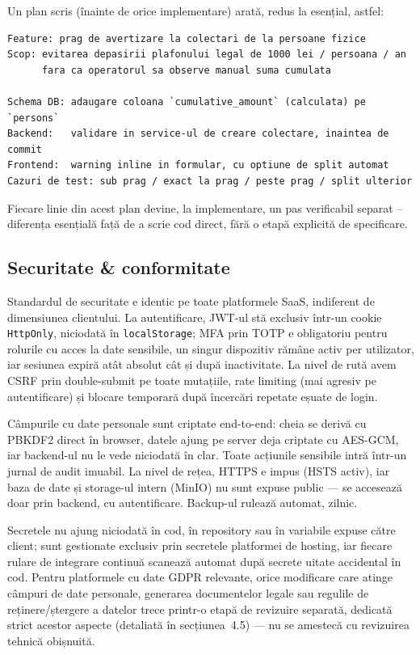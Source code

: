 \documentclass[11pt, a4paper]{article}
\begin{document}
Un plan scris (înainte de orice implementare) arată, redus la esențial, astfel:

\begingroup\small
\begin{verbatim}
Feature: prag de avertizare la colectari de la persoane fizice
Scop: evitarea depasirii plafonului legal de 1000 lei / persoana / an
      fara ca operatorul sa observe manual suma cumulata

Schema DB: adaugare coloana `cumulative_amount` (calculata) pe `persons`
Backend:   validare in service-ul de creare colectare, inaintea de commit
Frontend:  warning inline in formular, cu optiune de split automat
Cazuri de test: sub prag / exact la prag / peste prag / split ulterior
\end{verbatim}
\endgroup

\vspace{0.3em}
\noindent Fiecare linie din acest plan devine, la implementare, un pas verificabil separat --
diferența esențială față de a scrie cod direct, fără o etapă explicită de specificare.

\subsection{Securitate \& conformitate}

Standardul de securitate e identic pe toate platformele SaaS, indiferent de dimensiunea
clientului. La autentificare, JWT-ul stă exclusiv într-un cookie \texttt{HttpOnly}, niciodată în
\texttt{localStorage}; MFA prin TOTP e obligatoriu pentru rolurile cu acces la date sensibile, un
singur dispozitiv rămâne activ per utilizator, iar sesiunea expiră atât absolut cât și după
inactivitate. La nivel de rută avem CSRF prin double-submit pe toate mutațiile, rate limiting
(mai agresiv pe autentificare) și blocare temporară după încercări repetate eșuate de login.

Câmpurile cu date personale sunt criptate end-to-end: cheia se derivă cu PBKDF2 direct în
browser, datele ajung pe server deja criptate cu AES-GCM, iar backend-ul nu le vede niciodată în
clar. Toate acțiunile sensibile intră într-un jurnal de audit imuabil. La nivel de rețea, HTTPS
e impus (HSTS activ), iar baza de date și storage-ul intern (MinIO) nu sunt expuse public — se
accesează doar prin backend, cu autentificare. Backup-ul rulează automat, zilnic.

Secretele nu ajung niciodată în cod, în repository sau în variabile expuse către client; sunt
gestionate exclusiv prin secretele platformei de hosting, iar fiecare rulare de integrare
continuă scanează automat după secrete uitate accidental în cod. Pentru platformele cu date GDPR
relevante, orice modificare care atinge câmpuri de date personale, generarea documentelor legale
sau regulile de reținere/ștergere a datelor trece printr-o etapă de revizuire separată, dedicată
strict acestor aspecte (detaliată în secțiunea~4.5) — nu se amestecă cu revizuirea tehnică
obișnuită.
\end{document}
